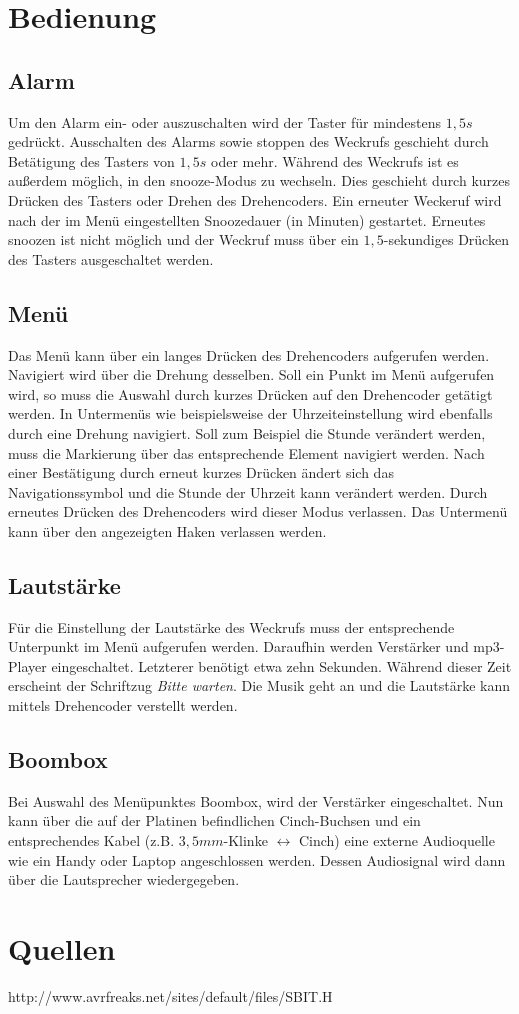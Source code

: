 \documentclass[journal, a4paper]{IEEEtran}
\begin{document}
\section{Bedienung}
\subsection{Alarm}
Um den Alarm ein- oder auszuschalten wird der Taster für mindestens $1,5s$ gedrückt. Ausschalten des Alarms sowie stoppen des Weckrufs geschieht durch Betätigung des Tasters von $1,5s$ oder mehr. Während des Weckrufs ist es außerdem möglich, in den snooze-Modus zu wechseln. Dies geschieht durch kurzes Drücken des Tasters oder Drehen des Drehencoders. Ein erneuter Weckeruf wird nach der im Menü eingestellten Snoozedauer (in Minuten) gestartet. Erneutes snoozen ist nicht möglich und der Weckruf muss über ein $1,5$-sekundiges Drücken des Tasters ausgeschaltet werden.
\subsection{Menü}
Das Menü kann über ein langes Drücken des Drehencoders aufgerufen werden. Navigiert wird über die Drehung desselben. Soll ein Punkt im Menü aufgerufen wird, so muss die Auswahl durch kurzes Drücken auf den Drehencoder getätigt werden. In Untermenüs wie beispielsweise der Uhrzeiteinstellung wird ebenfalls durch eine Drehung navigiert. Soll zum Beispiel die Stunde verändert werden, muss die Markierung über das entsprechende Element navigiert werden. Nach einer Bestätigung durch erneut kurzes Drücken ändert sich das Navigationssymbol und die Stunde der Uhrzeit kann verändert werden. Durch erneutes Drücken des Drehencoders wird dieser Modus verlassen. Das Untermenü kann über den angezeigten Haken verlassen werden.
\subsection{Lautstärke}
Für die Einstellung der Lautstärke des Weckrufs muss der entsprechende Unterpunkt im Menü aufgerufen werden. Daraufhin werden Verstärker und mp3-Player eingeschaltet. Letzterer benötigt etwa zehn Sekunden. Während dieser Zeit erscheint der Schriftzug \emph{\glqq Bitte warten\grqq}. Die Musik geht an und die Lautstärke kann mittels Drehencoder verstellt werden.
\subsection{Boombox}
Bei Auswahl des Menüpunktes Boombox, wird der Verstärker eingeschaltet. Nun kann über die auf der Platinen befindlichen Cinch-Buchsen und ein entsprechendes Kabel (z.B. $3,5mm$-Klinke $\leftrightarrow$ Cinch) eine externe Audioquelle wie ein Handy oder Laptop angeschlossen werden. Dessen Audiosignal wird dann über die Lautsprecher wiedergegeben.
\section{Quellen}
http://www.avrfreaks.net/sites/default/files/SBIT.H
\end{document}
